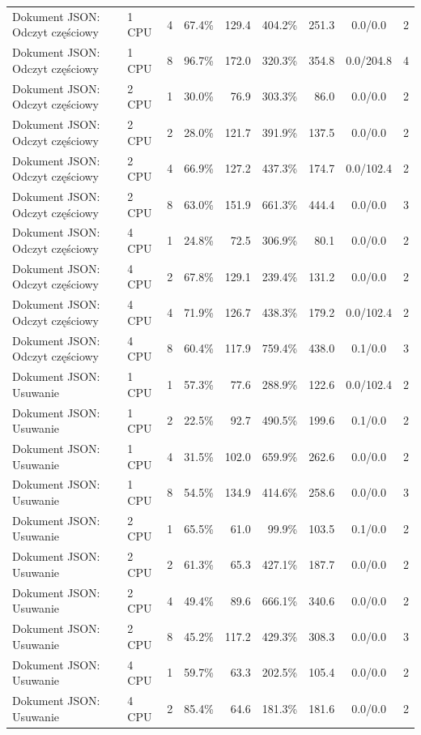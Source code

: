 \begin{table}[ht]
{\begin{tabular}{llcrrrrcc}
Dokument JSON: Odczyt częściowy & 1 CPU & 4 & 67.4\% & 129.4 & 404.2\% & 251.3 & 0.0/0.0 & 2 \\
Dokument JSON: Odczyt częściowy & 1 CPU & 8 & 96.7\% & 172.0 & 320.3\% & 354.8 & 0.0/204.8 & 4 \\
Dokument JSON: Odczyt częściowy & 2 CPU & 1 & 30.0\% & 76.9 & 303.3\% & 86.0 & 0.0/0.0 & 2 \\
Dokument JSON: Odczyt częściowy & 2 CPU & 2 & 28.0\% & 121.7 & 391.9\% & 137.5 & 0.0/0.0 & 2 \\
Dokument JSON: Odczyt częściowy & 2 CPU & 4 & 66.9\% & 127.2 & 437.3\% & 174.7 & 0.0/102.4 & 2 \\
Dokument JSON: Odczyt częściowy & 2 CPU & 8 & 63.0\% & 151.9 & 661.3\% & 444.4 & 0.0/0.0 & 3 \\
Dokument JSON: Odczyt częściowy & 4 CPU & 1 & 24.8\% & 72.5 & 306.9\% & 80.1 & 0.0/0.0 & 2 \\
Dokument JSON: Odczyt częściowy & 4 CPU & 2 & 67.8\% & 129.1 & 239.4\% & 131.2 & 0.0/0.0 & 2 \\
Dokument JSON: Odczyt częściowy & 4 CPU & 4 & 71.9\% & 126.7 & 438.3\% & 179.2 & 0.0/102.4 & 2 \\
Dokument JSON: Odczyt częściowy & 4 CPU & 8 & 60.4\% & 117.9 & 759.4\% & 438.0 & 0.1/0.0 & 3 \\
Dokument JSON: Usuwanie & 1 CPU & 1 & 57.3\% & 77.6 & 288.9\% & 122.6 & 0.0/102.4 & 2 \\
Dokument JSON: Usuwanie & 1 CPU & 2 & 22.5\% & 92.7 & 490.5\% & 199.6 & 0.1/0.0 & 2 \\
Dokument JSON: Usuwanie & 1 CPU & 4 & 31.5\% & 102.0 & 659.9\% & 262.6 & 0.0/0.0 & 2 \\
Dokument JSON: Usuwanie & 1 CPU & 8 & 54.5\% & 134.9 & 414.6\% & 258.6 & 0.0/0.0 & 3 \\
Dokument JSON: Usuwanie & 2 CPU & 1 & 65.5\% & 61.0 & 99.9\% & 103.5 & 0.1/0.0 & 2 \\
Dokument JSON: Usuwanie & 2 CPU & 2 & 61.3\% & 65.3 & 427.1\% & 187.7 & 0.0/0.0 & 2 \\
Dokument JSON: Usuwanie & 2 CPU & 4 & 49.4\% & 89.6 & 666.1\% & 340.6 & 0.0/0.0 & 2 \\
Dokument JSON: Usuwanie & 2 CPU & 8 & 45.2\% & 117.2 & 429.3\% & 308.3 & 0.0/0.0 & 3 \\
Dokument JSON: Usuwanie & 4 CPU & 1 & 59.7\% & 63.3 & 202.5\% & 105.4 & 0.0/0.0 & 2 \\
Dokument JSON: Usuwanie & 4 CPU & 2 & 85.4\% & 64.6 & 181.3\% & 181.6 & 0.0/0.0 & 2 \\

\end{tabular}}
\end{table}
